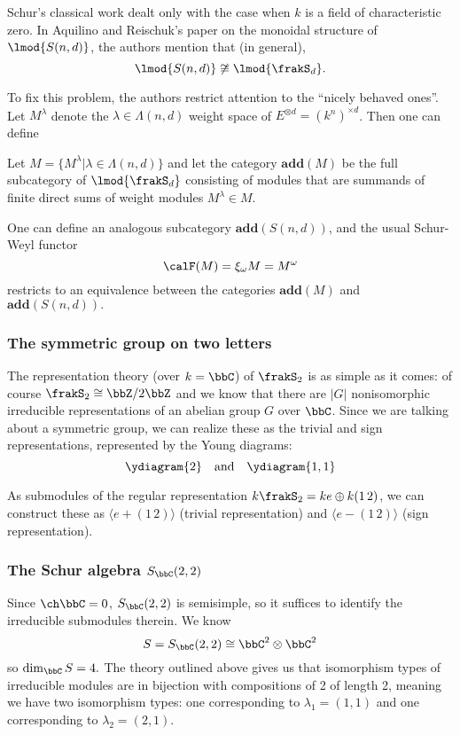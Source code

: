 \documentclass[12pt]{article}
\begin{document}
	Schur's classical work dealt only with the case when $k$ is a field of characteristic zero. In Aquilino and Reischuk's paper \cite{aquilino-reischuk} 
	on the monoidal structure of $\lmod{S(n,d)}$, the authors mention that (in general),
	\[\lmod{S(n,d)}\not\cong\lmod{\frakS_d}.\]

	To fix this problem, the authors restrict attention to the ``nicely behaved ones''. Let $M^\lambda$ denote 
	the $\lambda\in\Lambda(n,d)$ weight space of $E^{\otimes d}=(k^n)^{\times d}$. Then one can define 
	\begin{defn}
		Let $M=\{M^\lambda|\lambda\in\Lambda(n,d)\}$ and let the category $\mathbf{add}(M)$ be the full subcategory of $\lmod{\frakS_d}$ consisting 
		of modules that are summands of finite direct sums of weight modules $M^\lambda\in M$.
	\end{defn}
	One can define an analogous subcategory $\mathbf{add}(S(n,d))$, and the usual Schur-Weyl functor 
	\[\calF(M)=\xi_\omega M=M^\omega\]
	restricts to an equivalence between the categories $\mathbf{add}(M)$ and $\mathbf{add}(S(n,d)).$

		\subsubsection{The symmetric group on two letters}
		The representation theory (over $k=\bbC$) of $\frakS_2$ is as simple as it comes: of course $\frakS_2\cong \bbZ/2\bbZ$ and we know that 
		there are $|G|$ nonisomorphic irreducible representations of an abelian group $G$ over $\bbC$. Since we are talking about a symmetric group, 
		we can realize these as the trivial and sign representations, represented by the Young diagrams:
		\[\ydiagram{2}\quad\text{and}\quad\ydiagram{1,1}\]

		As submodules of the regular representation $k\frakS_2= k e\oplus k(1\,2)$, we can construct these as $\langle e+(1\, 2)\rangle$ (trivial representation) and $\langle e-(1\,2)\rangle$ (sign representation).

		\subsubsection{The Schur algebra \texorpdfstring{$S_\bbC(2,2)$}{S(2,2)}}
		Since $\ch\bbC=0$, $S_\bbC(2,2)$ is semisimple, so it suffices to identify the irreducible submodules therein.
		We know 
		\[S=S_\bbC(2,2)\cong \bbC^2\otimes\bbC^2\]
		so $\dim_\bbC S=4.$ The theory outlined above gives us that isomorphism types of irreducible modules are in bijection with compositions of 2 of length 2, meaning 
		we have two isomorphism types: one corresponding to $\lambda_1=(1,1)$ and one corresponding to $\lambda_2=(2,1)$. 
\end{document}
